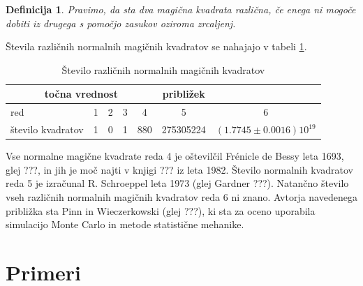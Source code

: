 \documentclass[a4paper,12pt]{article}
\newtheorem{Definicija}{Definicija}
\begin{document}

\begin{Definicija}
         Pravimo, da sta dva magična kvadrata \emph{različna}, če enega ni mogoče dobiti
         iz drugega s pomočjo zasukov oziroma zrcaljenj.
\end{Definicija}

Števila različnih normalnih magičnih kvadratov se nahajajo v tabeli \ref{table:stevila}.


\begin{table}
   \caption{Število različnih normalnih magičnih kvadratov}
   \label{table:stevila}
\begin{tabular}{lcccccc}\toprule
              \multicolumn{5}{c}{točna vrednost} & približek \\ \midrule
   red &              1 & 2 & 3 & 4 & 5 & 6 \\
   število kvadratov & 1 & 0 & 1 & 880 & 275305224 & $(1.7745 \pm 0.0016)10^19$ \\ \bottomrule
\end{tabular}
\end{table}

Vse normalne magične kvadrate reda 4 je oštevilčil Frénicle de Bessy
leta 1693, glej ???, in jih je moč najti v knjigi ???
iz leta 1982. Število normalnih kvadratov reda 5 je izračunal
R. Schroeppel leta 1973 (glej Gardner ???).
Natančno število vseh različnih normalnih magičnih kvadratov reda 6 ni znano.
Avtorja navedenega približka sta Pinn in Wieczerkowski (glej ???), ki
sta za oceno uporabila simulacijo Monte Carlo in metode statistične mehanike.


\section{Primeri}
\end{document}
